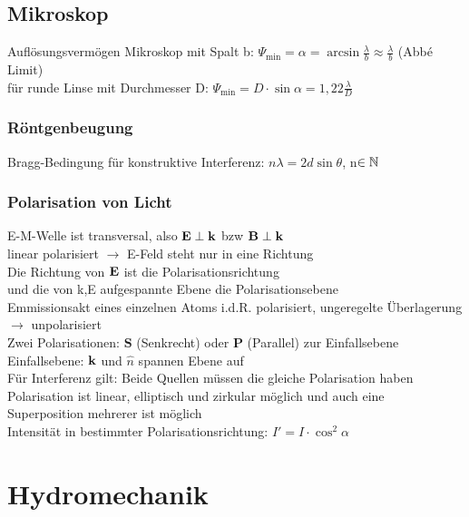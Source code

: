 \documentclass[fs, footer]{latex4ei}
\begin{document}
\begin{multicols*}{4}
\subsection{Mikroskop}
Auflösungsvermögen Mikroskop mit Spalt b: $\Psi_{\text{min}} = \alpha = \arcsin\frac{\lambda}{b} \approx \frac{\lambda}{b}$ (Abbé Limit)\\
für runde Linse mit Durchmesser D: $\Psi_{\text{min}} = D\cdot\sin\alpha = 1,22\frac{\lambda}{D}$\\
\subsubsection{Röntgenbeugung}
Bragg-Bedingung für konstruktive Interferenz: $n\lambda = 2d\sin\theta $, n$\in \mathbb{N} $\\
\subsubsection{Polarisation von Licht}
E-M-Welle ist transversal, also $\textbf{E} \perp \textbf{k}$ bzw $\textbf{B}\perp\textbf{k}$\\
linear polarisiert $\rightarrow$ E-Feld steht nur in eine Richtung\\
Die Richtung von $\textbf{E}$ ist die Polarisationsrichtung\\
und die von k,E aufgespannte Ebene die Polarisationsebene\\

Emmissionsakt eines einzelnen Atoms i.d.R. polarisiert, ungeregelte Überlagerung $\rightarrow$ unpolarisiert\\
Zwei Polarisationen:
$\textbf{S}$ (Senkrecht) oder $\textbf{P}$ (Parallel) zur Einfallsebene\\
Einfallsebene: $\textbf{k}$ und $\hat n$ spannen Ebene auf\\
Für Interferenz gilt: Beide Quellen müssen die gleiche Polarisation haben\\
Polarisation ist linear, elliptisch und zirkular möglich und auch eine Superposition mehrerer ist möglich\\

Intensität in bestimmter Polarisationsrichtung: $I' = I\cdot\cos ^2\alpha$\\



\section{Hydromechanik}


\end{multicols*}
\end{document}
